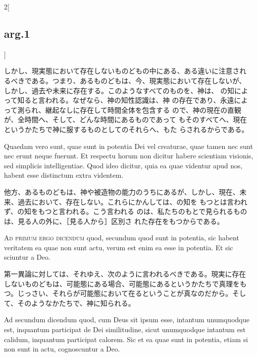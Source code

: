 \documentclass[paper=a4paper,fontsize=10pt,jafontsize=9pt,titlepage]{jlreq}
\begin{document}
\begin{paracol}{2}[\subsection{arg.1}]
\switchcolumn

しかし、現実態において存在しないものどもの中にある、ある違いに注意され
るべきである。つまり、あるものどもは、今、現実態において存在しないが、
しかし、過去や未来に存在する。このようなすべてのものを、神は、
の知によって知ると言われる。なぜなら、神の知性認識は、神
の存在であり、永遠によって測られ、継起なしに存在して時間全体を包含する
ので、神の現在の直観が、全時間へ、そして、どんな時間にあるものであって
もそのすべてへ、現在というかたちで神に服するものとしてのそれらへ、もた
らされるからである。

\switchcolumn*

Quaedam vero sunt, quae sunt in potentia Dei vel creaturae, quae tamen
nec sunt nec erunt neque fuerunt. Et respectu horum non dicitur habere
scientiam visionis, sed simplicis intelligentiae. Quod ideo dicitur,
quia ea quae videntur apud nos, habent esse distinctum extra videntem.

\switchcolumn

他方、あるものどもは、神や被造物の能力のうちにあるが、しかし、現在、未
来、過去において、存在しない。これらにかんしては、の知を
もつとは言われず、の知をもつと言われる。こう言われる
のは、私たちのもとで見られるものは、見る人の外に、［見る人から］区別さ
れた存在をもつからである。

\switchcolumn*[\subsection{ad.1}]

{\scshape Ad primum ergo dicendum} quod, secundum quod sunt in
potentia, sic habent veritatem ea quae non sunt actu, verum est enim
ea esse in potentia. Et sic sciuntur a Deo.

\switchcolumn

第一異論に対しては、それゆえ、次のように言われるべきである。現実に存在
しないものどもは、可能態にある場合、可能態にあるというかたちで真理をも
つ。じっさい、それらが可能態において在るということが真なのだから。そし
て、そのようなかたちで、神に知られる。

\switchcolumn*

Ad secundum dicendum quod, cum Deus sit ipsum esse, intantum
unumquodque est, inquantum participat de Dei similitudine, sicut
unumquodque intantum est calidum, inquantum participat calorem. Sic et
ea quae sunt in potentia, etiam si non sunt in actu, cognoscuntur a
Deo.

\switchcolumn


\end{paracol}
\end{document}
